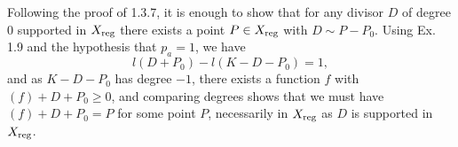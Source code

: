 \documentclass{report}
\begin{document}
\bigskip
{}	Following the proof of 1.3.7, it is enough to show that for any divisor $D$ of degree 0 supported in
$X_{\rm reg}$ there exists a point $P\in X_{\rm reg}$ with $D\sim P-P_0$.  Using Ex. 1.9 and the hypothesis
that $p_a=1$, we have 
$$l(D+P_0)-l(K-D-P_0)=1,$$
and as $K-D-P_0$ has degree $-1$, there exists a function $f$ with $(f)+D+P_0\ge 0$, and comparing degrees
shows that we must have$(f)+D+P_0=P$ for some point $P$, necessarily in $X_{\rm reg}$ as $D$ is supported in 
$X_{\rm reg}$.
\end{document}
